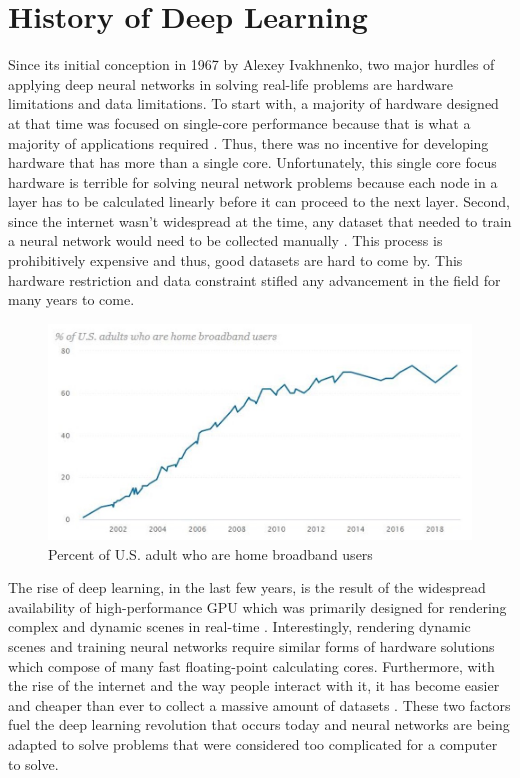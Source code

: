 \documentclass{IEEEtran}
\begin{document}
    
    \section{History of Deep Learning}
        Since its initial conception in 1967 by Alexey Ivakhnenko, two major hurdles of applying deep neural networks in solving real-life problems are hardware limitations and data limitations. To start with, a majority of hardware designed at that time was focused on single-core performance because that is what a majority of applications required \cite{inproceedings}. Thus, there was no incentive for developing hardware that has more than a single core. Unfortunately, this single core focus hardware is terrible for solving neural network problems because each node in a layer has to be calculated linearly before it can proceed to the next layer. Second, since the internet wasn’t widespread at the time, any dataset that needed to train a neural network would need to be collected manually \cite{pew_research_center}. This process is prohibitively expensive and thus, good datasets are hard to come by. This hardware restriction and data constraint stifled any advancement in the field for many years to come.

        \begin{figure}[!htb]
            \centering
            \captionsetup{justification=centering}
            \includegraphics[width=\linewidth]{USBroadband.png}
            \caption{Percent of U.S. adult who are home broadband users}  
        \end{figure}

        The rise of deep learning, in the last few years, is the result of the widespread availability of high-performance GPU which was primarily designed for rendering complex and dynamic scenes in real-time \cite{nickolls_dally_2010}. Interestingly, rendering dynamic scenes and training neural networks require similar forms of hardware solutions which compose of many fast floating-point calculating cores. Furthermore, with the rise of the internet and the way people interact with it, it has become easier and cheaper than ever to collect a massive amount of datasets \cite{deng_dong_socher_li_li_fei-fei_2009}. These two factors fuel the deep learning revolution that occurs today and neural networks are being adapted to solve problems that were considered too complicated for a computer to solve.
        
\end{document}
